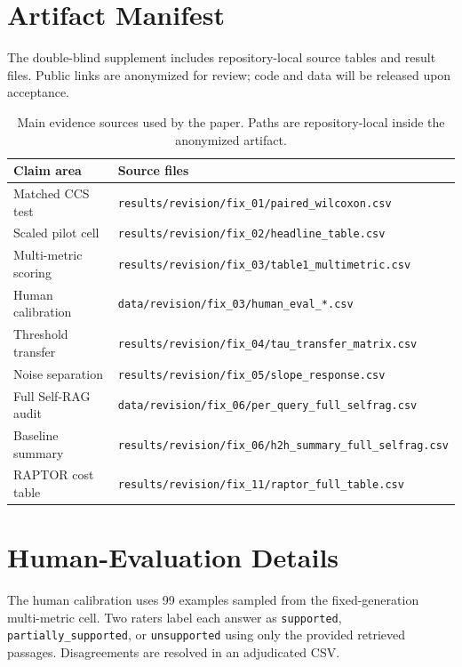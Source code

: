 \section{Artifact Manifest}
\label{app:manifest}

The double-blind supplement includes repository-local source tables and
result files. Public links are anonymized for review; code and data will be
released upon acceptance.

\begin{table}[H]
\centering
\small
\caption{Main evidence sources used by the paper. Paths are repository-local
inside the anonymized artifact.}
\label{tab:source_manifest}
\begin{tabular}{ll}
\toprule
Claim area & Source files \\
\midrule
Matched CCS test & \verb|results/revision/fix_01/paired_wilcoxon.csv| \\
Scaled pilot cell & \verb|results/revision/fix_02/headline_table.csv| \\
Multi-metric scoring & \verb|results/revision/fix_03/table1_multimetric.csv| \\
Human calibration & \verb|data/revision/fix_03/human_eval_*.csv| \\
Threshold transfer & \verb|results/revision/fix_04/tau_transfer_matrix.csv| \\
Noise separation & \verb|results/revision/fix_05/slope_response.csv| \\
Full Self-RAG audit & \verb|data/revision/fix_06/per_query_full_selfrag.csv| \\
Baseline summary & \verb|results/revision/fix_06/h2h_summary_full_selfrag.csv| \\
RAPTOR cost table & \verb|results/revision/fix_11/raptor_full_table.csv| \\
\bottomrule
\end{tabular}
\end{table}

\section{Human-Evaluation Details}
\label{app:human_eval}

The human calibration uses 99 examples sampled from the fixed-generation
multi-metric cell. Two raters label each answer as \verb|supported|,
\verb|partially_supported|, or \verb|unsupported| using only the provided
retrieved passages. Disagreements are resolved in an adjudicated CSV.

